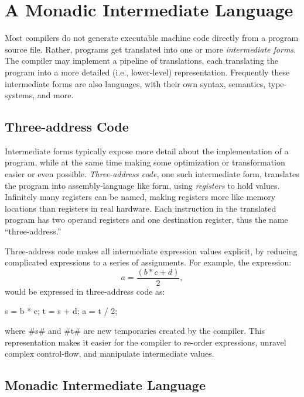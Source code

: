 \documentclass[12pt]{report}
\begin{document}


\chapter{A Monadic Intermediate Language}
\label{ref_chapter_mil}

Most compilers do not generate executable machine code directly from a
program source file. Rather, programs get translated into one or more
\emph{intermediate forms}. The compiler may implement a pipeline of
translations, each translating the program into a more detailed (i.e.,
lower-level) representation. Frequently these intermediate forms are 
also languages, with their own syntax, semantics, type-systems,
and more. 

\section{Three-address Code}

Intermediate forms typically expose more detail about the
implementation of a program, while at the same time making some
optimization or transformation easier or even possible. 
\emph{Three-address code}, one such intermediate form, translates the
program into assembly-language like form, using \emph{registers} to
hold values. Infinitely many registers can be named, making registers
more like memory locations than registers in real hardware. Each
instruction in the translated program has two operand registers and one
destination register, thus the name ``three-address.'' 

Three-address code makes all intermediate expression values explicit, 
by reducing complicated expressions to a series of assignments. 
For example, the expression:
\begin{equation}
  a = \frac{(b * c + d)}{2},
\end{equation}
would be expressed in three-address code as:
\begin{AVerb}
  s = b * c;
  t = s + d;
  a = t / 2;
\end{AVerb}
where #s# and #t# are new temporaries created by the compiler. This 
representation makes it easier for the compiler to re-order expressions,
unravel complex control-flow, and manipulate intermediate values. 

\section{Monadic Intermediate Language}
\end{document}
